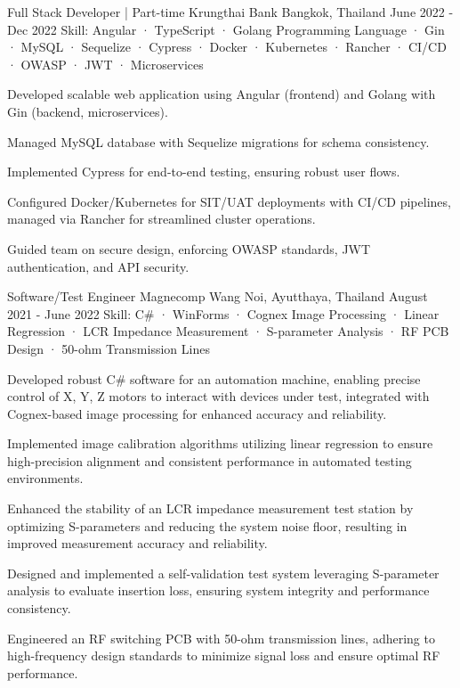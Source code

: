 \begin{cventries}
  \cventry
    {Full Stack Developer | Part-time} %
    {Krungthai Bank} %
    {Bangkok, Thailand} %
    {June 2022 - Dec 2022} %
    {Skill: Angular · TypeScript · Golang Programming Language · Gin · MySQL · Sequelize · Cypress · Docker · Kubernetes · Rancher · CI/CD · OWASP · JWT · Microservices} %
    {
    \begin{cvitems} %
      \item {Developed scalable web application using Angular (frontend) and Golang with Gin (backend, microservices).}
      \item {Managed MySQL database with Sequelize migrations for schema consistency.}
      \item {Implemented Cypress for end-to-end testing, ensuring robust user flows.}
      \item {Configured Docker/Kubernetes for SIT/UAT deployments with CI/CD pipelines, managed via Rancher for streamlined cluster operations.}
      \item {Guided team on secure design, enforcing OWASP standards, JWT authentication, and API security.}
    \end{cvitems}
  }

  \cventry
    {Software/Test Engineer} %
    {Magnecomp} %
    {Wang Noi, Ayutthaya, Thailand} %
    {August 2021 - June 2022} %
    {Skill: C\# · WinForms · Cognex Image Processing · Linear Regression · LCR Impedance Measurement · S-parameter Analysis · RF PCB Design · 50-ohm Transmission Lines} %
    {
      \begin{cvitems} %
      \item {Developed robust C\# software for an automation machine, enabling precise control of X, Y, Z motors to interact with devices under test, integrated with Cognex-based image processing for enhanced accuracy and reliability.}
      \item {Implemented image calibration algorithms utilizing linear regression to ensure high-precision alignment and consistent performance in automated testing environments.}
      \item {Enhanced the stability of an LCR impedance measurement test station by optimizing S-parameters and reducing the system noise floor, resulting in improved measurement accuracy and reliability.}
      \item {Designed and implemented a self-validation test system leveraging S-parameter analysis to evaluate insertion loss, ensuring system integrity and performance consistency.}
      \item {Engineered an RF switching PCB with 50-ohm transmission lines, adhering to high-frequency design standards to minimize signal loss and ensure optimal RF performance.}
      \end{cvitems}
    }


\end{cventries}
